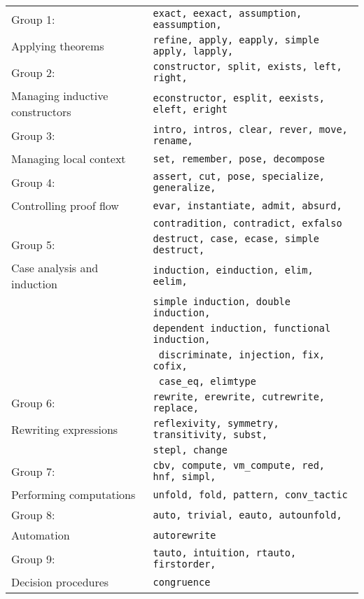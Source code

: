 \begin{table}[h]
{\begin{tabular}{l||l}
\hline
\hline
Group 1:           &  \lstinline?exact, eexact, assumption, eassumption, ?\\
Applying theorems &  \lstinline?refine, apply, eapply, simple apply, lapply, ?\\
\hline
Group 2:           &  \lstinline?constructor, split, exists, left, right, ?\\
Managing inductive constructors & \lstinline?econstructor, esplit, eexists, eleft, eright?\\
\hline
Group 3:           &  \lstinline?intro, intros, clear, rever, move, rename,  ?\\
Managing local context & \lstinline?set, remember, pose, decompose?\\
\hline
Group 4:            &  \lstinline?assert, cut, pose, specialize, generalize, ?\\
Controlling proof flow & \lstinline?evar, instantiate, admit, absurd, ?\\
& \lstinline?contradition, contradict, exfalso?\\
\hline
Group 5:            & \lstinline?destruct, case, ecase, simple destruct,?\\
Case analysis and induction & \lstinline?induction, einduction, elim, eelim, ?\\
 & \lstinline?simple induction, double induction, ?\\
     & \lstinline?dependent induction, functional induction,?\\
  & \lstinline? discriminate, injection, fix, cofix, ?\\
    & \lstinline? case_eq, elimtype?\\
\hline
Group 6:          &  \lstinline?rewrite, erewrite, cutrewrite, replace, ?\\
Rewriting expressions &  \lstinline?reflexivity, symmetry, transitivity, subst, ?\\
&  \lstinline?stepl, change?\\
\hline
Group 7:          &  \lstinline?cbv, compute, vm_compute, red, hnf, simpl, ?\\
Performing computations  &  \lstinline?unfold, fold, pattern, conv_tactic?\\
\hline
Group 8:           &  \lstinline?auto, trivial, eauto, autounfold, ?\\
Automation       &  \lstinline?autorewrite?\\
\hline
Group 9:           &  \lstinline?tauto, intuition, rtauto, firstorder, ?\\
Decision procedures & \lstinline?congruence?\\

\end{tabular}}
\end{table}
